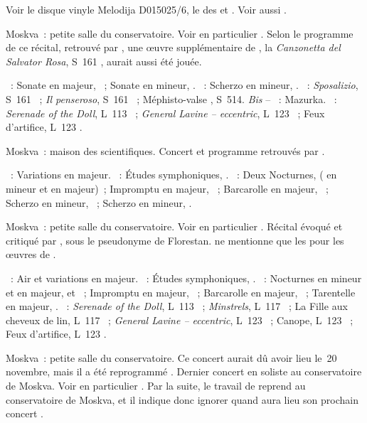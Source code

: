 \begin{description}
 Voir le disque vinyle Melodija D015025/6, le  des
  et \citet[p.~70, note~14]{White}.
 Voir aussi \citet[p.~4 et~6]{Nikonovich11}.
 \item[\DateWithWeekDay{1960-11-06}]
 Moskva~: petite salle du conservatoire.
 Voir en particulier \citet[p.~452]{Milshteyn82a}.
 Selon le programme de ce récital, retrouvé par \citet{TADGO1960}, une œuvre
 supplémentaire de \Liszt{}, la \emph{Canzonetta del Salvator Rosa}, S~161
 , aurait aussi été jouée.

 \textsc{\Beethoven{}}~: Sonate en \kD majeur, ~; Sonate en \kC
 mineur, .
 \textsc{\Chopin{}}~: Scherzo en \kC \Sharp mineur, .
 \textsc{\Liszt{}}~: \emph{Sposalizio}, S~161 ~; \emph{Il
 penseroso}, S~161 ~; Méphisto-valse , S~514.
 \emph{Bis} -- \textsc{\Chopin{}}~: Mazurka.
 \textsc{\Debussy{}}~: \emph{Serenade of the Doll}, L~113 ~;
 \emph{General Lavine -- eccentric}, L~123 ~; Feux d'artifice,
 L~123 .
 \item[\DateWithWeekDay{1960-11-14}]
 Moskva~: maison des scientifiques.
 Concert et programme retrouvés par \citet{TADGO1960}.

 \textsc{\Haendel{}}~: Variations en \kE majeur.
 \textsc{\Schumann{}}~: Études symphoniques, .
 \textsc{\Chopin{}}~: Deux Nocturnes,  ( en \kC \Sharp
 mineur et  en \kD \Flat majeur)~; Impromptu  en \kG
 \Flat majeur, ~; Barcarolle en \kF \Sharp majeur, ~;
 Scherzo  en \kC \Sharp mineur, ~; Scherzo  en
 \kB \Flat mineur, .
 \item[\DateWithWeekDay{1960-11-22}]
 Moskva~: petite salle du conservatoire.
 Voir en particulier \citet[p.~440 et p.~452]{Milshteyn82a}.
 Récital évoqué et critiqué par \citet[p.~138-139]{Rabinovich61}, sous le
 pseudonyme de Florestan.
 \citet[p.~189]{Nekrasova08} ne mentionne que les  pour les
 œuvres de \Chopin{}.

 \textsc{\Haendel{}}~: Air et variations en \kE majeur.
 \textsc{\Schumann{}}~: Études symphoniques, .
 \textsc{\Chopin{}}~: Nocturnes en \kC \Sharp mineur et en \kD \Flat majeur,
   et ~; Impromptu en \kG \Flat majeur,
 ~; Barcarolle en \kF \Sharp majeur, ~; Tarentelle en \kA
 \Flat majeur, .
 \textsc{\Debussy{}}~: \emph{Serenade of the Doll}, L~113 ~;
 \emph{Minstrels}, L~117 ~; La Fille aux cheveux de lin, L~117
 ~; \emph{General Lavine -- eccentric}, L~123 ~;
 Canope, L~123 ~; Feux d'artifice, L~123 .
 \item[\DateWithWeekDay{1960-12-05}]
 Moskva~: petite salle du conservatoire.
 Ce concert aurait dû avoir lieu le~20 novembre, mais il a été reprogrammé
 \citep{TADGO1960}.
 Dernier concert en soliste au conservatoire de Moskva.
 Voir en particulier \citet[p.~441 et p.~452]{Milshteyn82a}.
 Par la suite, le travail de \VSofronitsky{} reprend au conservatoire de
 Moskva, et il indique donc ignorer quand aura lieu son prochain concert
 \citep[voir][p.~416]{Shiryaeva}.


\end{description}
